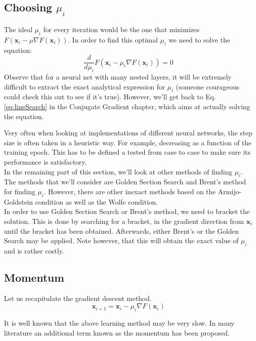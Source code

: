 \documentclass[a4paper,10pt]{article}
\theoremstyle{definition}
\begin{document}
\subsection{Choosing $\mu_i$}

The ideal $\mu_i$ for every iteration would be the one that minimizes $F(\pmb{x}_i -\mu \nabla F(\pmb{x}_i))$. In order to find this optimal $\mu_i$ we need to solve the equation:
\begin{equation}
	\frac{d}{d\mu_i}F(\pmb{x}_i -\mu_i \nabla F(\pmb{x}_i)) = 0
	\label{eq:lineSearch}
\end{equation}
Observe that for a neural net with many nested layers, it will be extremely difficult to extract the exact analytical expression for $\mu_i$ (someone courageous could check this out to see if it's true). However, we'll get back to Eq. \ref{eq:lineSearch} in the Conjugate Gradient chapter, which aims at actually solving the equation.

Very often when looking at implementations of different neural networks, the step size is often taken in a heuristic way. For example, decreasing as a function of the training epoch. This has to be defined a tested from case to case to make sure its performance is satisfactory.\\

In the remaining part of this section, we'll look at other methods of finding $\mu_i$. The methods that we'll consider are Golden Section Search and Brent's method for finding $\mu_i$. However, there are other inexact methods based on the Armijo-Goldstein condition as well as the Wolfe condition.\\

In order to use Golden Section Search or Brent's method, we need to bracket the solution. This is done by searching for a bracket, in the gradient direction from $\pmb{x}_i$ until the bracket has been obtained. Afterwards, either Brent's or the Golden Search may be applied. Note however, that this will obtain the exact value of $\mu_i$ and is rather costly.

\subsection{Momentum}
Let us recapitulate the gradient descent method.
\begin{equation}
	\pmb{x}_{i+1} = \pmb{x}_i - \mu_i \nabla F(\pmb{x}_i)
\end{equation}

It is well known that the above learning method may be very slow. In many literature an additional term known as the momentum has been proposed.
\end{document}
